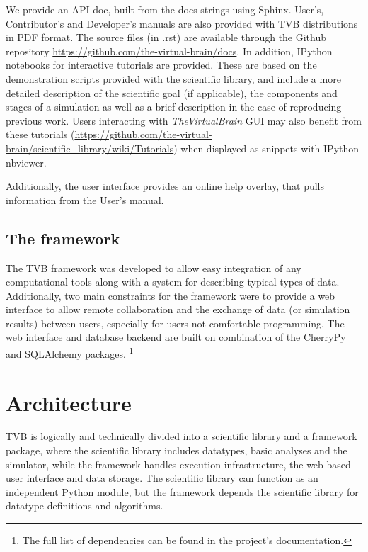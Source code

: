 \documentclass{bioinfo}
\newcommand{\TVB}{\textit{TheVirtualBrain }}
\begin{document}
We provide an API doc, built from the docs strings using Sphinx.
User's, Contributor's and Developer's manuals are also provided with TVB
distributions in PDF format. The source files (in .rst) are available
through the Github repository \url{https://github.com/the-virtual-brain/docs}.  
In addition, IPython notebooks \citep{PerezGranger_2007}
for interactive tutorials are provided. These are based on the
demonstration scripts provided with the scientific library, and
include a more detailed description of the scientific goal (if
applicable), the components and stages of a simulation as well as a
brief description in the case of reproducing previous work. Users
interacting with \TVB GUI may also benefit from these tutorials
(\url{https://github.com/the-virtual-
brain/scientific_library/wiki/Tutorials}) when displayed as snippets
with IPython nbviewer. 

Additionally, the user interface provides an online help overlay, that pulls
information from the User's manual.

\subsection{The framework}

The TVB framework was developed to allow easy integration of any computational
tools along with a system for describing typical types of data.  Additionally,
two main constraints for the framework were to provide a web interface to allow
remote collaboration and the exchange of data (or simulation results) between
users, especially for users not comfortable programming. The web interface and
database backend are built on combination of the \textsf{CherryPy} and
\textsf{SQLAlchemy} packages.  \footnote{The full list of dependencies can be
found in the project's documentation.} 

\section{Architecture}

TVB is logically and technically divided into a scientific
library and a framework package, where the scientific library includes
datatypes, basic analyses and the simulator, while the
framework handles execution infrastructure, the web-based user interface and
data storage.  The scientific library can function as an independent Python
module, but the framework depends the scientific library for datatype definitions
and algorithms. 
\end{document}
